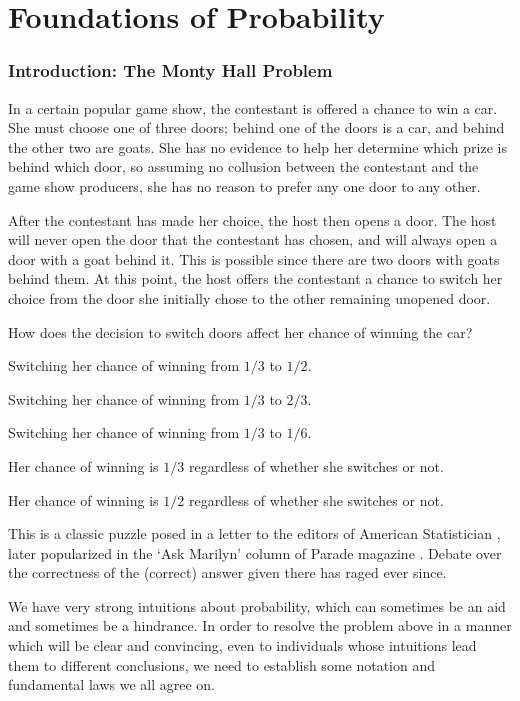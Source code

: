 \pagestyle{headings}
\setcounter{chapter}{0}
\chapter{Foundations of Probability} \label{chp 1}
\thispagestyle{fancy}
\setcounter{page}{1}

\subsection*{Introduction: The Monty Hall Problem}
In a certain popular game show, the contestant is offered a chance to win a car. She must choose one of three doors; behind one of the doors is a car, and behind the other two are goats. She has no evidence to help her determine which prize is behind which door, so assuming no collusion between the contestant and the game show producers, she has no reason to prefer any one door to any other.
\par
After the contestant has made her choice, the host then opens a door. The host will never open the door that the contestant has chosen, and will always open a door with a goat behind it. This is possible since there are two doors with goats behind them. At this point, the host offers the contestant a chance to switch her choice from the door she initially chose to the other remaining unopened door. 
\par
How does the decision to switch doors affect her chance of winning the car?
\begin{itmize}
\item Switching  her chance of winning from $1/3$ to $1/2$.
\item Switching  her chance of winning from $1/3$ to $2/3$.
\item Switching  her chance of winning from $1/3$ to $1/6$.
\item Her chance of winning is $1/3$ regardless of whether she switches or not.
\item Her chance of winning is $1/2$ regardless of whether she switches or not.
\end{itmize}
\par
This is a classic puzzle posed in a letter to the editors of American Statistician \cite{MontyHallOriginal}, later popularized in the `Ask Marilyn' column of Parade magazine \cite{vosSavant}. Debate over the correctness of the (correct) answer given there has raged ever since.
\par
We have very strong intuitions about probability, which can sometimes be an aid and sometimes be a hindrance. In order to resolve the problem above in a manner which will be clear and convincing, even to individuals whose intuitions lead them to different conclusions, we need to establish some notation and fundamental laws we all agree on.
\newpage

